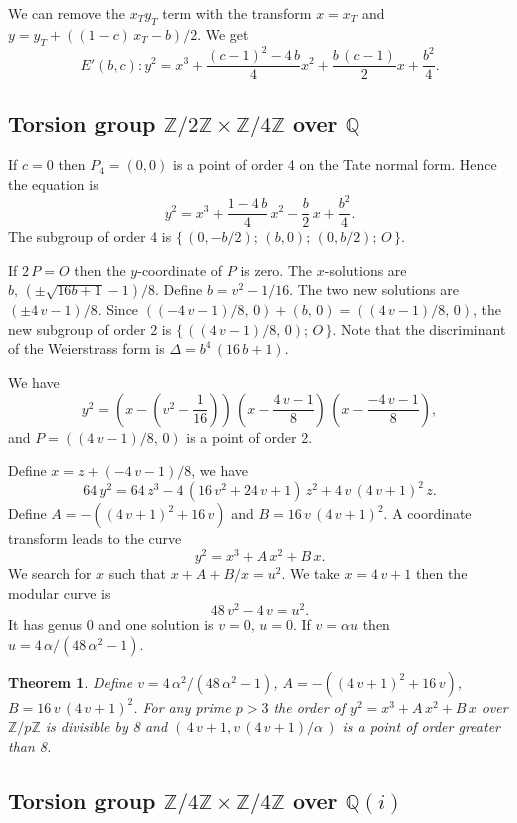 \documentclass[a4paper, 11pt, pdftex]{report}
\theoremstyle{plain}
\newtheorem{theorem}{Theorem}[chapter]
\theoremstyle{definition}
\begin{document}
We can remove the $x_T y_T$ term with the transform $x = x_T$ and $y = y_T + ((1 - c)\,x_T -  b)/2$.
We get
$$E'(b, c): y^2 = x^3 + \frac{(c - 1)^2 - 4\,b}{4} x^2 + \frac{b\,(c - 1)}{2} x + \frac{b^2}{4}.$$

\subsection{Torsion group $\mathbb{Z}/2\mathbb{Z} \times \mathbb{Z}/4\mathbb{Z}$ over $\mathbb{Q}$}

If $c = 0$ then $P_4 = (0, 0)$ is a point of order 4 on the Tate normal form. Hence the equation is
$$y^2 = x^3 + \frac{1 - 4\,b}{4}\, x^2 - \frac{b}{2}\, x + \frac{b^2}{4}.$$
The subgroup of order 4 is $\{\,(0, -b/2);\, (b, 0);\, (0, b/2);\, O\, \}$.

If $2\,P = O$ then the $y$-coordinate of $P$ is zero. The $x$-solutions are
$b,\, (\pm\sqrt{16 b+1} - 1)/8$. Define $b = v^2 - 1/16$. The two new solutions are
 $(\pm4\,v - 1)/8$. Since $((-4\,v - 1)/8,\, 0) + (b,\, 0) = ((4\,v - 1)/8,\, 0)$,
the new subgroup of order 2 is $\{\,((4\,v - 1)/8,\, 0);\, O\, \}$. Note that the
discriminant of the Weierstrass form is $\Delta = b^4\,(16\,b + 1)$.

We have
$$y^2 = \left(x - \left(v^2 - \frac{1}{16}\right)\right)\,
 \left(x - \frac{4\,v - 1}{8}\right)\, \left(x - \frac{-4\,v - 1}{8}\right),$$
and $P = ((4\,v - 1)/8,\, 0)$ is a point of order 2.

Define $x = z + (-4\,v - 1)/8$, we have
$$64\, y^2 = 64\, z^3 - 4\,(16\,v^2 + 24\,v + 1)\, z^2 + 4\,v\,(4\,v + 1)^2\, z.$$
Define $A = -((4\,v+1)^2 + 16\,v)$ and $B = 16\,v\,(4\,v + 1)^2$.
A coordinate transform leads to the curve
$$y^2 = x^3 + A\, x^2 + B\, x.$$
We search for $x$ such that $x + A + B / x = u^2.$ We take $x = 4\,v + 1$ then
the modular curve is
$$48\,v^2 - 4\,v = u^2.$$
It has genus 0 and one solution is $v = 0$, $u = 0$. If $v = \alpha u$ then
$u = 4\,\alpha / (48\, \alpha^2 - 1)$.

\begin{theorem}
Define $v = 4\,\alpha^2 / (48\, \alpha^2 - 1)$, $A = -((4\,v+1)^2 + 16\,v)$,
$B = 16\,v\,(4\,v + 1)^2$. For any prime $p > 3$ the order of $y^2 = x^3 + A\, x^2 + B\, x$
over $\mathbb{Z}/p\mathbb{Z}$ is divisible by 8 and $(\,4\,v + 1, v\,(4\,v + 1) / \alpha \,)$
is a point of order greater than 8.
\end{theorem}

\subsection{Torsion group $\mathbb{Z}/4\mathbb{Z} \times \mathbb{Z}/4\mathbb{Z}$ over $\mathbb{Q}(i)$}
\end{document}
